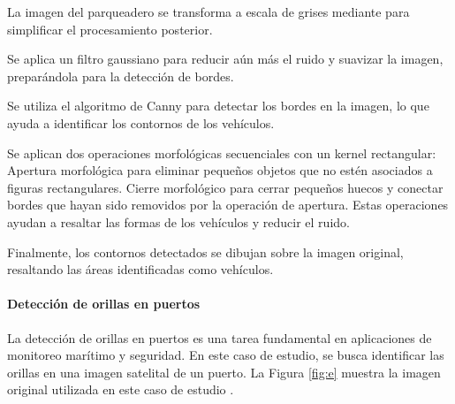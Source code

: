 \begin{seriate}

   \item La imagen del parqueadero se transforma a escala de grises mediante para simplificar el procesamiento posterior.
    
    \item Se aplica un filtro gaussiano para reducir aún más el ruido y suavizar la imagen, preparándola para la detección de bordes.
    
    \item Se utiliza el algoritmo de Canny para detectar los bordes en la imagen, lo que ayuda a identificar los contornos de los vehículos.
    
    \item Se aplican dos operaciones morfológicas secuenciales con un kernel rectangular: Apertura morfológica para eliminar pequeños objetos que no estén asociados a figuras rectangulares. Cierre morfológico  para cerrar pequeños huecos y conectar bordes que hayan sido removidos por la operación de apertura. Estas operaciones ayudan a resaltar las formas de los vehículos y reducir el ruido.
    
    \item Finalmente, los contornos detectados se dibujan sobre la imagen original, resaltando las áreas identificadas como vehículos.
    
    \end{seriate}

\paragraph{Detección de orillas en puertos} La detección de orillas en puertos es una tarea fundamental en aplicaciones de monitoreo marítimo y seguridad. En este caso de estudio, se busca identificar las orillas en una imagen satelital de un puerto. La Figura \ref{fig:e} muestra la imagen original utilizada en este caso de estudio \autocite{ShipsSatelliteImagery}.


